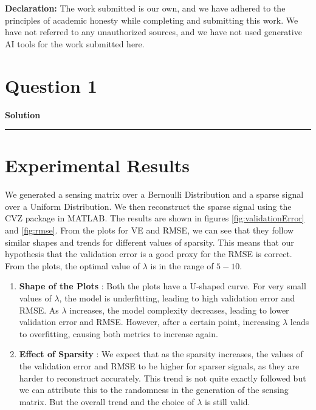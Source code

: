 \documentclass[a4paper,12pt]{article}
\title{\cooltitle{CS754 Assignment-4}}
\author{{\bf Saksham Rathi, Ekansh Ravi Shankar, Kshitij Vaidya}}
\date{}
\newenvironment{solution}[2][]{%
    \begin{mdframed}[linecolor=blue!70!black, linewidth=2pt, roundcorner=10pt, backgroundcolor=yellow!10!white, skipabove=12pt, skipbelow=12pt]%
        \textbf{\large #2}
        \par\noindent\rule{\textwidth}{0.4pt}
}{
    \end{mdframed}
}
\begin{document}
\maketitle
\textbf{Declaration:} The work submitted is our own, and
we have adhered to the principles of academic honesty while completing and submitting this work. We have not referred to any unauthorized sources, and we have not used generative AI tools for the work submitted here.

\section*{Question 1}

\begin{solution}{Solution}
  \section{Experimental Results}

  We generated a sensing matrix over a Bernoulli Distribution and a sparse signal over a Uniform Distribution. We then reconstruct the sparse signal using the CVZ package in MATLAB. The results are shown in figures \ref{fig:validationError} and \ref{fig:rmse}. From the plots for VE and RMSE, we can see that they follow similar shapes and trends for different values of sparsity. This means that our hypothesis that the validation error is a good proxy for the RMSE is correct. From the plots, the optimal value of $\lambda$ is in the range of $5-10$.
  \begin{enumerate}
  \item \textbf{Shape of the Plots} : Both the plots have a U-shaped curve. For very small values of $\lambda$, the model is underfitting, leading to high validation error and RMSE. As $\lambda$ increases, the model complexity decreases, leading to lower validation error and RMSE. However, after a certain point, increasing $\lambda$ leads to overfitting, causing both metrics to increase again.

  \item \textbf{Effect of Sparsity} : We expect that as the sparsity increases, the values of the validation error and RMSE to be higher for sparser signals, as they are harder to reconstruct accurately. This trend is not quite exactly followed but we can attribute this to the randomness in the generation of the sensing matrix. But the overall trend and the choice of $\lambda$ is still valid.
  \end{enumerate}


\end{solution}
\end{document}
